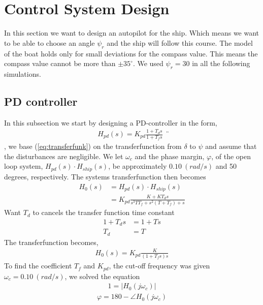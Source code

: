 \section{Control System Design} \label{sec:part3}
In this section we want to design an autopilot for the ship. Which means we want to be able to choose an angle $\psi_r$ and the ship will follow this course. The model of the boat holds only for small deviations for the compass value. This means the compass value cannot be more than $\pm 35^{\circ}$. We used $\psi_r = 30$ in all the following simulations. 

\subsection{PD controller}
In this subsection we start by designing a PD-controller in the form, 
\begin{equation}
\begin{split}
   H_{pd}(s) = K_{pd} \frac{1+T_d s}{1+T_f s}
\end{split} ¨
\label{eq:transferfunk}
\end{equation}
, we base (\ref{eq:transferfunk}) on the transferfunction from $\delta$ to $\psi$ and assume that the disturbances are negligible. We let $\omega_c$ and the phase margin, $\varphi$, of the open loop system, $H_{pd}(s) \cdot H_{ship}(s)$, be approximately $0.10 \  (rad/s)$ and 50 degrees, respectively. The systems transferfunction then becomes 
\begin{equation}
\begin{split}
    H_0(s) &= H_{pd}(s) \cdot H_{ship}(s) \\
    &= K_{pd} \frac{K + KT_d s}{s^3 T T_f +s^2(T + T_f) + s}
\end{split}
\end{equation}
\bigskip
Want $T_d$ to cancels the transfer function time constant
\begin{align*}
    1 + T_d s &= 1 + Ts \\
    T_d &= T
\end{align*}
The transferfunction becomes, 
\begin{equation}
\begin{split}
   H_{0}(s) = K_{pd} \frac{K}{(1+T_f s)s}
\end{split} 
\end{equation}
To find the coefficient $T_f$ and $K_{pd}$, the cut-off frequency was given $\omega_c = 0.10 \ (rad/s)$, we solved the equation 
\begin{equation}
    \begin{split}
        1 = |H_0(j\omega_{c})|
    \end{split}
\end{equation}
\begin{equation}
    \begin{split}
      \varphi = 180 - \angle H_0(j\omega_c)
    \end{split}
\end{equation}

